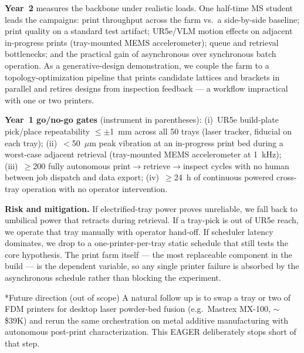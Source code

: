 \documentclass[11pt]{article}
\makeatletter
\renewcommand{\section}{\@startsection{section}{1}{0pt}{1.0ex plus 0.3ex}{0.3ex}{\normalfont\bfseries}}
\makeatother
\begin{document}
\textbf{Year~2} measures the backbone under realistic loads. One half-time MS student leads the campaigns: print throughput across the farm vs.\ a side-by-side baseline; print quality on a standard test artifact; UR5e/VLM motion effects on adjacent in-progress prints (tray-mounted MEMS accelerometer); queue and retrieval bottlenecks; and the practical gain of asynchronous over synchronous batch operation. As a generative-design demonstration, we couple the farm to a topology-optimization pipeline that prints candidate lattices and brackets in parallel and retires designs from inspection feedback --- a workflow impractical with one or two printers.

\textbf{Year~1 go/no-go gates} (instrument in parentheses): (i)~UR5e build-plate pick/place repeatability $\le\pm$1~mm across all 50 trays (laser tracker, fiducial on each tray); (ii)~$<$50~$\mu$m peak vibration at an in-progress print bed during a worst-case adjacent retrieval (tray-mounted MEMS accelerometer at 1~kHz); (iii)~$\ge$200 fully autonomous print$\rightarrow$retrieve$\rightarrow$inspect cycles with no human between job dispatch and data export; (iv)~$\ge$24~h of continuous powered cross-tray operation with no operator intervention.

\textbf{Risk and mitigation.} If electrified-tray power proves unreliable, we fall back to umbilical power that retracts during retrieval. If a tray-pick is out of UR5e reach, we operate that tray manually with operator hand-off. If scheduler latency dominates, we drop to a one-printer-per-tray static schedule that still tests the core hypothesis. The print farm itself --- the most replaceable component in the build --- is the dependent variable, so any single printer failure is absorbed by the asynchronous schedule rather than blocking the experiment.

\section*{Future direction (out of scope)}
A natural follow up is to swap a tray or two of FDM printers for desktop laser powder-bed fusion (e.g.\ Mastrex MX-100, $\sim$\$39K) and rerun the same orchestration on metal additive manufacturing with autonomous post-print characterization. This EAGER deliberately stops short of that step.
\end{document}
